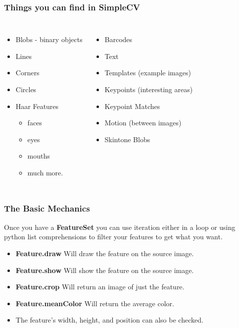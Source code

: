 \documentclass{beamer}
\begin{document}
\begin{frame}
  \frametitle{Things you can find in SimpleCV}

  \begin{columns}[c] %

    \begin{itemize}
    \item Blobs - binary objects
    \item Lines
    \item Corners
    \item Circles
    \item Haar Features
      \begin{itemize}
        \item faces
        \item eyes
        \item mouths
        \item much more.
        \end{itemize}
    \end{itemize}

    \begin{itemize}
    \item Barcodes
    \item Text
    \item Templates (example images)
    \item Keypoints (interesting areas)
    \item Keypoint Matches
    \item Motion (between images)
    \item Skintone Blobs
    \end{itemize}

  \end{columns}
\end{frame}
\begin{frame}
  \frametitle{The Basic Mechanics}

Once you have a \textbf{FeatureSet} you can use iteration either in a
loop or using python list comprehensions to filter your features to
get what you want. 
\begin{itemize}
\item \textbf{Feature.draw} Will draw the feature on the source image.
\item \textbf{Feature.show} Will show the feature on the source image.
\item \textbf{Feature.crop} Will return an image of just the feature.
\item \textbf{Feature.meanColor} Will return the average color. 
\item The feature's width, height, and position can also be checked.
\end{itemize}
\end{frame}
\end{document}
